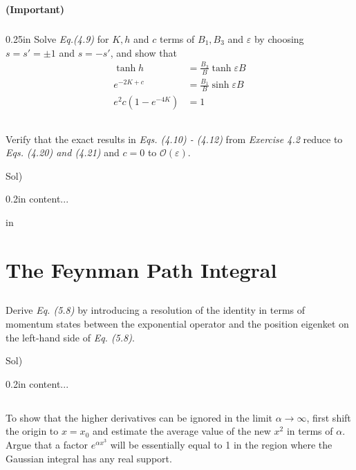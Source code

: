 \documentclass[paper=a4, fontsize=11pt]{scrartcl}
\numberwithin{equation}{section}
\numberwithin{figure}{section}
\numberwithin{table}{section}
\newenvironment{problem}{\subsection{}}{}
\newenvironment{subproblem}{\subsubsection{}\begin{adjustwidth}{0.25in}{}\vspace{-0.28in}}{\end{adjustwidth}}
\newenvironment{solution}{Sol) \begin{adjustwidth}{0.2in}{}\vspace{0.1in}}{\end{adjustwidth}}
\begin{document}
\begin{problem}
	\textbf{(Important)}
	\begin{subproblem}
		Solve \textit{Eq.(4.9)} for $K,h$ and $c$ terms of $B_1,B_3$ and $\varepsilon$ by choosing $s=s'=\pm 1$ and $s=-s'$, and show that \\[3pt]
		
		\begin{equation}
			\begin{split}
			\tanh{h} &= \frac{B_3}{B} \tanh{\varepsilon B} \\
			e^{-2K+c} &= \frac{B_1}{B} \sinh{\varepsilon B} \\
			e^2c \left(1-e^{-4K} \right) &= 1 
			\end{split} 
			\nonumber
		\end{equation}
	\end{subproblem}
\end{problem}

\vskip 0.3in

\begin{problem}
	Verify that the exact results in \textit{Eqs. (4.10) - (4.12)} from \textit{Exercise 4.2} reduce to \textit{Eqs. (4.20) and (4.21)} and $c=0$ to $\mathcal{O}\left( \varepsilon \right)$.
	
\end{problem}
\vskip 0.1in
\begin{solution}
	content...
\end{solution}
 in
\section{The Feynman Path Integral}
\vskip 0.3in
\begin{problem}
	Derive \textit{Eq. (5.8)} by introducing a resolution of the identity in terms of momentum states between the exponential operator and the position eigenket on the left-hand side of \textit{Eq. (5.8)}.
	
\end{problem} 
\vskip 0.1in
\begin{solution}
	content...
\end{solution}

\vskip 0.3in

\begin{problem}
	 To show that the higher derivatives can be ignored in the limit $\alpha \to \infty$, first shift the origin to $x=x_0$ and estimate the average value of the new $x^2$ in terms of $\alpha$. Argue that a factor $e^{\alpha x^3}$ will be essentially equal to 1 in the region where the Gaussian integral has any real support.
\end{problem}\\
\end{document}
